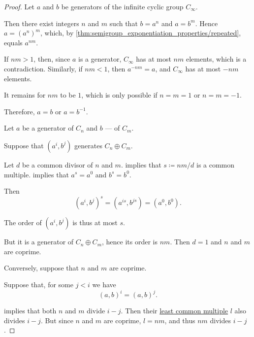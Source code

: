 \begin{proof}
   Let \( a \) and \( b \) be generators of the infinite cyclic group \( C_\infty \).

  Then there exist integers \( n \) and \( m \) such that \( b = a^n \) and \( a = b^m \). Hence \( a = (a^n)^m \), which, by \cref{thm:semigroup_exponentiation_properties/repeated}, equals \( a^{nm} \).

  If \( nm > 1 \), then, since \( a \) is a generator, \( C_\infty \) has at most \( nm \) elements, which is a contradiction. Similarly, if \( nm < 1 \), then \( a^{-nm} = a \), and \( C_\infty \) has at most \( -nm \) elements.

  It remains for \( nm \) to be \( 1 \), which is only possible if \( n = m = 1 \) or \( n = m = -1 \).

  Therefore, \( a = b \) or \( a = b^{-1} \).

   Let \( a \) be a generator of \( C_n \) and \( b \) --- of \( C_m \).

  \SufficiencySubProof* Suppose that \( (a^i, b^j) \) generates \( C_n \oplus C_m \).

  Let \( d \) be a common divisor of \( n \) and \( m \).  implies that \( s \coloneqq nm / d \) is a common multiple.  implies that \( a^s = a^0 \) and \( b^s = b^0 \).

  Then
  \begin{equation*}
    (a^i, b^j)^s = (a^{is}, b^{js}) = (a^0, b^0).
  \end{equation*}

  The order of \( (a^i, b^j) \) is thus at most \( s \).

  But it is a generator of \( C_n \oplus C_m \), hence its order is \( nm \). Then \( d = 1 \) and \( n \) and \( m \) are coprime.

  \NecessitySubProof* Conversely, suppose that \( n \) and \( m \) are coprime.

  Suppose that, for some \( j < i \) we have
  \begin{equation*}
    (a, b)^i = (a, b)^j.
  \end{equation*}

   implies that both \( n \) and \( m \) divide \( i - j \). Then their \hyperref[def:lcm]{least common multiple} \( l \) also divides \( i - j \). But since \( n \) and \( m \) are coprime, \( l = nm \), and thus \( nm \) divides \( i - j \).


\end{proof}
